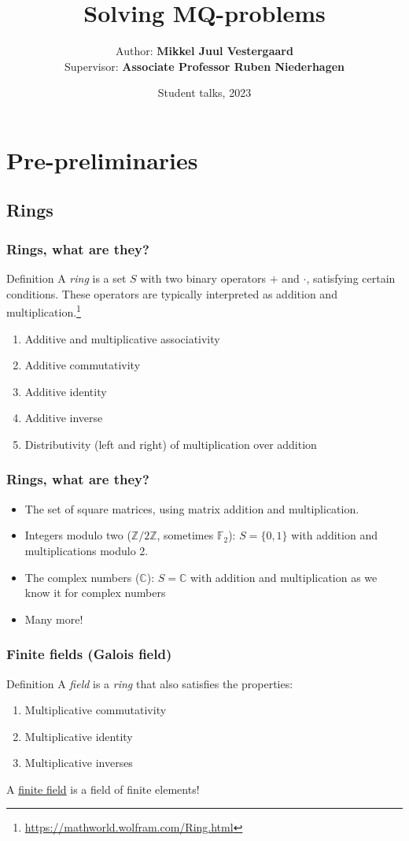 \documentclass{beamer}
\title{Solving MQ-problems}
\author{Author: \textbf{Mikkel Juul Vestergaard}\\Supervisor: \textbf{Associate Professor Ruben Niederhagen}}
\institute{Department of Mathematics and Computer Science\\University of Southern Denmark}
\date{Student talks, 2023}
\begin{document}
\frame{\titlepage}

\section{Pre-preliminaries}
\subsection{Rings}
\begin{frame}
    \frametitle{Rings, what are they?}
    \begin{block}{Definition}
        A \textit{ring} is a set $S$ with two binary operators $+$ and $\cdot$, satisfying certain conditions. These operators are typically interpreted as addition and multiplication.\footnote{\url{https://mathworld.wolfram.com/Ring.html}}
        \begin{enumerate}
            \item Additive and multiplicative associativity
            \item Additive commutativity
            \item Additive identity
            \item Additive inverse
            \item Distributivity (left and right) of multiplication over addition
        \end{enumerate}
    \end{block}
\end{frame}

\begin{frame}
    \frametitle{Rings, what are they?}
    \begin{itemize}
        \item The set of square matrices, using matrix addition and multiplication.
        \item Integers modulo two ($\mathbb{Z}/2\mathbb{Z}$, sometimes $\mathbb{F}_2$): $S = \{0, 1\}$ with addition and multiplications modulo 2.
        \item The complex numbers ($\mathbb{C}$): $S = \mathbb{C}$ with addition and multiplication as we know it for complex numbers 
        \item Many more!
    \end{itemize}
\end{frame}

\begin{frame}
    \frametitle{Finite fields (Galois field)}
    \begin{block}{Definition}
        A \textit{field} is a \textit{ring} that also satisfies the properties:
        \begin{enumerate}
            \item Multiplicative commutativity
            \item Multiplicative identity
            \item Multiplicative inverses
        \end{enumerate}
    \end{block} \pause
    A \underline{finite field} is a field of finite elements!
\end{frame}
\end{document}
